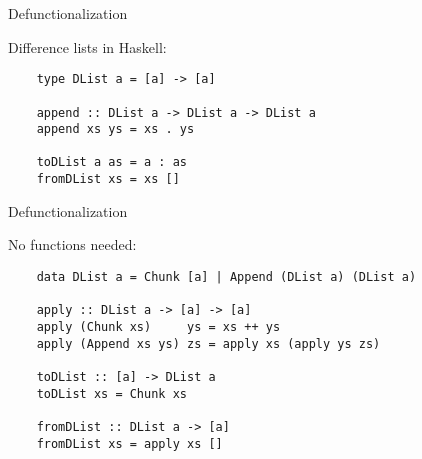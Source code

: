 \documentclass[dvipsnames,aspectratio=169]{beamer}
\theoremstyle{remark}
\begin{document}
\begin{frame}[fragile]{Defunctionalization}

Difference lists in Haskell:
\vspace{1em}

\begin{exampleblock}{}
\begin{verbatim}
    type DList a = [a] -> [a]

    append :: DList a -> DList a -> DList a
    append xs ys = xs . ys

    toDList a as = a : as
    fromDList xs = xs []
\end{verbatim}
\end{exampleblock}
\end{frame}

\begin{frame}[fragile]{Defunctionalization}

No functions needed:
\vspace{1em}

\begin{exampleblock}{}
\begin{verbatim}
    data DList a = Chunk [a] | Append (DList a) (DList a)

    apply :: DList a -> [a] -> [a]
    apply (Chunk xs)     ys = xs ++ ys
    apply (Append xs ys) zs = apply xs (apply ys zs)

    toDList :: [a] -> DList a
    toDList xs = Chunk xs

    fromDList :: DList a -> [a]
    fromDList xs = apply xs []
\end{verbatim}
\end{exampleblock}
\end{frame}
\end{document}
